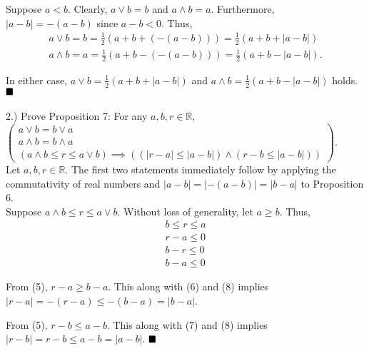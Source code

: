 \documentclass{book}
\begin{document}
Suppose $a < b$. Clearly, $a \lor b = b$ and $a \land b = a$. Furthermore, $|a - b| = -(a - b)$ since $a - b < 0$. Thus, 
\begin{align}
    a \lor b = b = \frac{1}{2}(a + b + (-(a - b))) = \frac{1}{2}(a + b + |a - b|)
\\  a \land b = a = \frac{1}{2}(a + b - (-(a - b))) = \frac{1}{2}(a + b - |a - b|).
\end{align}

In either case, $a \lor b = \frac{1}{2}(a + b + |a - b|)$ and $a \land b = \frac{1}{2}(a + b - |a - b|)$ holds.
$\hfill \blacksquare$ \\ \\


2.) Prove Proposition 7: For any $a, b, r \in \mathbb{R}$,
$\left(\begin{array}{ll}
    a \lor b = b \lor a
\\  a \land b = b \land a
\\  (a \land b \leq r \leq a \lor b) \implies ((|r - a| \leq |a - b|) \land (r - b \leq |a - b|))
\end{array}\right)$. \\

Let $a, b, r \in \mathbb{R}$. The first two statements immediately follow by applying the commutativity of real numbers and $|a - b| = |-(a - b)| = |b - a|$ to Proposition 6. \\

Suppose $a \land b \leq r \leq a \lor b$. Without loss of generality, let $a \geq b$. Thus, 
\begin{align}
    b \leq r \leq a
\\  r - a \leq 0
\\  b - r \leq 0
\\  b - a \leq 0
\end{align}

From (5), $r - a \geq b - a$. This along with (6) and (8) implies $|r - a| = -(r - a) \leq -(b - a) = |b - a|$.

From (5), $r - b \leq a - b$. This along with (7) and (8) implies $|r - b| = r - b \leq a - b = |a - b|$.
$\hfill \blacksquare$ \\ \\






\end{document}
